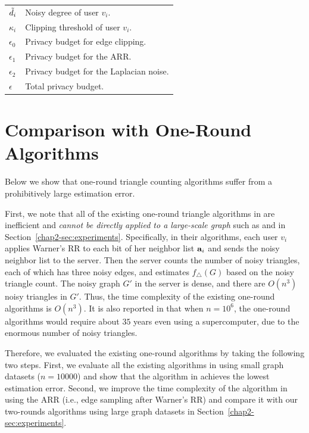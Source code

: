 \begin{table}[t]
{\begin{tabular}{l|l}
$\tilde{d}_i$     &   Noisy degree of user $v_i$.\\
$\kappa_i$ &   Clipping threshold of user $v_i$.\\
$\epsilon_0$     &       Privacy budget for edge clipping.\\
$\epsilon_1$     &       Privacy budget for the ARR.\\
$\epsilon_2$     &       Privacy budget for the Laplacian noise.\\
$\epsilon$     &       Total privacy budget.\\
\hline
\end{tabular}
\hfil}
\label{chap2-tab:notations}
\end{table}

\section{Comparison with One-Round Algorithms}
\label{chap2-sec:one-round}

Below we show that one-round triangle counting algorithms suffer from a prohibitively large estimation error.

First, we note that all of the existing one-round triangle algorithms in \cite{Imola_USENIX21,Ye_ICDE20,Ye_TKDE21} are inefficient and \textit{cannot be directly applied to a large-scale graph} such as \GPlus{} and \IMDB{} in Section~\ref{chap2-sec:experiments}.
Specifically, in their algorithms, each user $v_i$ applies Warner's RR to each bit of her neighbor list $\mathbf{a}_i$ and sends the noisy neighbor list to the server.
Then the server counts the number of noisy triangles, each of which has three noisy edges,
and estimates $f_\triangle(G)$ based on the noisy triangle count. 
The noisy graph $G'$ in the server is dense, and there are $O(n^3)$ noisy triangles in $G'$. 
Thus, the time complexity of the existing one-round algorithms \cite{Imola_USENIX21,Ye_ICDE20,Ye_TKDE21} is $O(n^3)$.
It is also reported in \cite{Imola_USENIX21} that when $n=10^6$, the one-round algorithms  would require about $35$ years even using a supercomputer, due to the enormous number of noisy triangles.

Therefore, we evaluated the existing one-round algorithms by taking the following two steps.
First, we evaluate all the existing algorithms in \cite{Imola_USENIX21,Ye_ICDE20,Ye_TKDE21} using small graph datasets ($n=10000$) and show that the algorithm in \cite{Imola_USENIX21} achieves the lowest estimation error.
Second, we improve the time complexity of the algorithm in \cite{Imola_USENIX21} using the ARR (i.e., edge sampling after Warner's RR) and compare it with our two-rounds algorithms using large graph datasets in Section~\ref{chap2-sec:experiments}.

